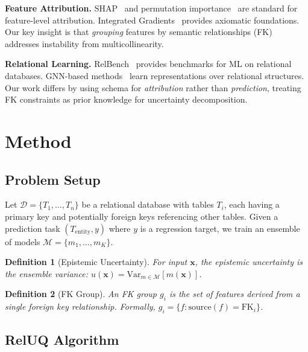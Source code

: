 \documentclass{article}
\newtheorem{definition}{Definition}
\begin{document}
\textbf{Feature Attribution.}
SHAP~\citep{lundberg2017unified} and permutation importance~\citep{breiman2001random} are standard
for feature-level attribution. Integrated Gradients~\citep{sundararajan2017axiomatic} provides
axiomatic foundations. Our key insight is that \emph{grouping} features by semantic
relationships (FK) addresses instability from multicollinearity.

\textbf{Relational Learning.}
RelBench~\citep{fey2024relbench} provides benchmarks for ML on relational databases.
GNN-based methods~\citep{schlichtkrull2018modeling,hamilton2017inductive} learn representations
over relational structures. Our work differs by using schema for \emph{attribution} rather
than \emph{prediction}, treating FK constraints as prior knowledge for uncertainty decomposition.

\section{Method}
\label{sec:method}

\subsection{Problem Setup}

Let $\mathcal{D} = \{T_1, \ldots, T_n\}$ be a relational database with tables $T_i$,
each having a primary key and potentially foreign keys referencing other tables.
Given a prediction task $(T_{\text{entity}}, y)$ where $y$ is a regression target,
we train an ensemble of models $\mathcal{M} = \{m_1, \ldots, m_K\}$.

\begin{definition}[Epistemic Uncertainty]
For input $\mathbf{x}$, the epistemic uncertainty is the ensemble variance:
$u(\mathbf{x}) = \text{Var}_{m \in \mathcal{M}}[m(\mathbf{x})]$.
\end{definition}

\begin{definition}[FK Group]
An FK group $g_i$ is the set of features derived from a single foreign key relationship.
Formally, $g_i = \{f : \text{source}(f) = \text{FK}_i\}$.
\end{definition}

\subsection{RelUQ Algorithm}
\end{document}
